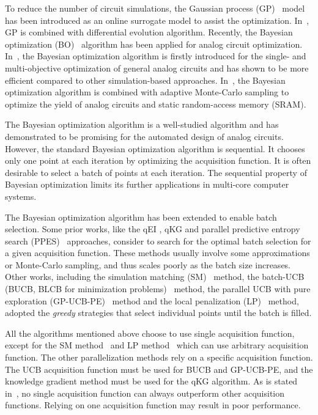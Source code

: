 %
To reduce the number of circuit simulations, the Gaussian process
(GP)~\cite{GPML} model has been introduced as an online surrogate model to
assist the optimization. In~\cite{liu2014gaspad}, GP is combined with
differential evolution algorithm. Recently, the
Bayesian optimization (BO)~\cite{shahriari2016taking} algorithm has been
applied for analog circuit optimization. In~\cite{lyu2017efficient}, the Bayesian optimization algorithm is
firstly introduced for the single- and multi-objective optimization of general analog circuits and has
shown to be more efficient compared to other simulation-based
approaches. In~\cite{wang2017efficient}, the Bayesian optimization algorithm
is combined with adaptive Monte-Carlo sampling to optimize the yield of analog
circuits and static random-access memory (SRAM).

The Bayesian optimization algorithm is a well-studied algorithm and has
demonstrated to be promising for the automated design of analog circuits.
However, the standard Bayesian optimization algorithm is sequential. It chooses
only one point at each iteration by optimizing the acquisition function. It is
often desirable to select a batch of points at each iteration. The sequential
property of Bayesian optimization limits its further applications in multi-core computer systems.

The Bayesian optimization algorithm has been extended to enable batch
selection. Some prior works, like the qEI \cite{qEI}, qKG \cite{wu2016parallel}
and parallel predictive entropy search (PPES)~\cite{shah2015parallel}
approaches, consider to search for the optimal batch selection for a given
acquisition function. These methods usually involve some approximations or
Monte-Carlo sampling, and thus scales poorly as the batch size increases. Other
works, including the simulation matching (SM)~\cite{azimi2010batch} method, the
batch-UCB (BUCB, BLCB for minimization
problems)~\cite{desautels2014parallelizing} method, the parallel UCB with pure
exploration (GP-UCB-PE)~\cite{contal2013parallel} method and the local
penalization (LP)~\cite{gonzalez2016batch} method, adopted the \emph{greedy}
strategies that select individual points until the batch is filled.

All the algorithms mentioned above choose to use single acquisition function,
except for the SM method~\cite{azimi2010batch} and LP method~\cite{gonzalez2016batch} which can use arbitrary acquisition
function. The other parallelization methods rely on a specific acquisition
function. The UCB acquisition function must be used for BUCB and GP-UCB-PE, and
the knowledge gradient method must be used for the qKG algorithm. As is stated
in~\cite{hoffman2011portfolio}, no single acquisition function can always
outperform other acquisition functions. Relying on one acquisition function may
result in poor performance.

